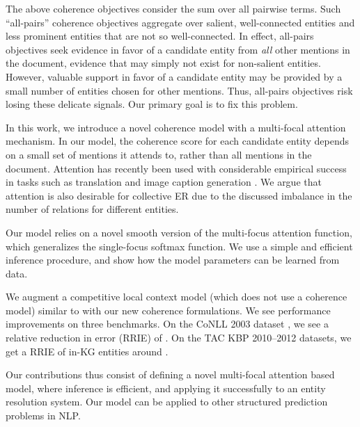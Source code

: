 

The above coherence objectives consider the sum over all pairwise terms. Such
``all-pairs'' coherence objectives aggregate over salient, well-connected
entities and less prominent entities that are not so well-connected.
In effect, all-pairs objectives seek evidence in favor of a candidate
entity from \emph{all} other mentions in the document, evidence that
may simply not exist for non-salient entities.  However, valuable
support in favor of a candidate entity may be provided by a small
number of entities chosen for other mentions.  Thus, all-pairs
objectives risk losing these delicate signals.  Our primary goal is to
fix this problem.

In this work, we introduce a novel coherence model with a multi-focal
attention mechanism. In our model, the coherence score for each
candidate entity depends on a small set of mentions it attends to,
rather than all mentions in the document. Attention has recently been
used with considerable empirical success in tasks such as translation
\cite{bahdanau2014neural} and image caption generation
\cite{xu2015show}. We argue that attention is also desirable for
collective ER due to the discussed imbalance in the number of
relations for different entities.

Our model relies on a novel smooth version of the multi-focus
attention function, which generalizes the single-focus softmax
function. We use a simple and efficient inference procedure, and show
how the model parameters can be learned from data.

We augment a competitive local context model (which does not use a
coherence model) similar to \cite{Lazic2015} with our new coherence
formulations.  We see performance improvements on three benchmarks.
On the CoNLL 2003 dataset \cite{Hoffart2011}, we see a relative
reduction in error (RRIE) of .  On the TAC KBP 2010--2012
datasets, we get a RRIE of in-KG entities around .

Our contributions thus consist of defining a novel multi-focal
attention based model, where inference is efficient, and applying it
successfully to an entity resolution system.  Our model can be applied
to other structured prediction problems in NLP.  

